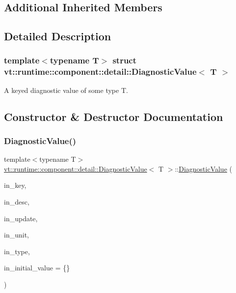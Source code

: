 \subsection*{Additional Inherited Members}


\subsection{Detailed Description}
\subsubsection*{template$<$typename T$>$\newline
struct vt\+::runtime\+::component\+::detail\+::\+Diagnostic\+Value$<$ T $>$}

A keyed diagnostic value of some type {\ttfamily T}. 

\subsection{Constructor \& Destructor Documentation}
\mbox{\label{structvt_1_1runtime_1_1component_1_1detail_1_1_diagnostic_value_a1f1d532b0ae94e08dedc322978f3a665}} 
\subsubsection{\texorpdfstring{Diagnostic\+Value()}{DiagnosticValue()}}
{\footnotesize\ttfamily template$<$typename T$>$ \\
\hyperlink{structvt_1_1runtime_1_1component_1_1detail_1_1_diagnostic_value}{vt\+::runtime\+::component\+::detail\+::\+Diagnostic\+Value}$<$ T $>$\+::\hyperlink{structvt_1_1runtime_1_1component_1_1detail_1_1_diagnostic_value}{Diagnostic\+Value} (\begin{DoxyParamCaption}\item[{std\+::string const \&}]{in\+\_\+key,  }\item[{std\+::string const \&}]{in\+\_\+desc,  }\item[{\hyperlink{namespacevt_1_1runtime_1_1component_a896637e6e183a909a17bfd8d3943c206}{Diagnostic\+Update}}]{in\+\_\+update,  }\item[{\hyperlink{namespacevt_1_1runtime_1_1component_a99ec18b08862c712176126bb7d0e307a}{Diagnostic\+Unit}}]{in\+\_\+unit,  }\item[{\hyperlink{namespacevt_1_1runtime_1_1component_af0bb99d9a054682217874bdc735ecac0}{Diagnostic\+Type\+Enum}}]{in\+\_\+type,  }\item[{T}]{in\+\_\+initial\+\_\+value = {\ttfamily \{\}} }\end{DoxyParamCaption})\hspace{0.3cm}{\ttfamily [inline]}}



